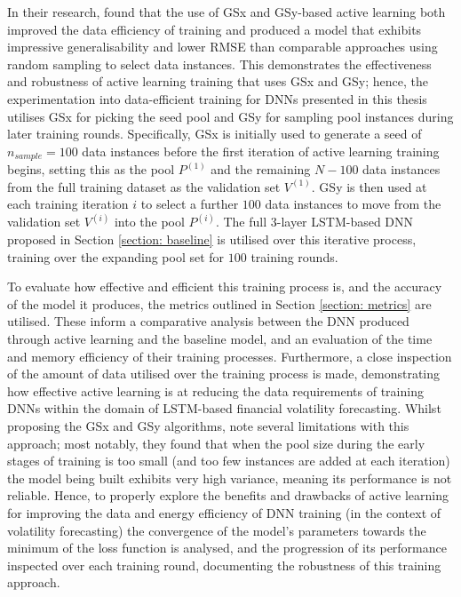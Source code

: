 \documentclass[a4paper, 11pt]{report}
\begin{document}
    In their research, \citet{wu-2019} found that the use of GSx and GSy-based active learning both improved the data efficiency of training and produced a model that exhibits impressive generalisability and lower RMSE than comparable approaches using random sampling to select data instances. This demonstrates the effectiveness and robustness of active learning training that uses GSx and GSy; hence, the experimentation into data-efficient training for DNNs presented in this thesis utilises GSx for picking the seed pool and GSy for sampling pool instances during later training rounds. Specifically, GSx is initially used to generate a seed of $n_{sample} = 100$ data instances before the first iteration of active learning training begins, setting this as the pool $P^{(1)}$ and the remaining $N - 100$ data instances from the full training dataset as the validation set $V^{(1)}$. GSy is then used at each training iteration $i$ to select a further $100$ data instances to move from the validation set $V^{(i)}$ into the pool $P^{(i)}$. The full $3$-layer LSTM-based DNN proposed in Section \ref{section: baseline} is utilised over this iterative process, training over the expanding pool set for $100$ training rounds.

    To evaluate how effective and efficient this training process is, and the accuracy of the model it produces, the metrics outlined in Section \ref{section: metrics} are utilised. These inform a comparative analysis between the DNN produced through active learning and the baseline model, and an evaluation of the time and memory efficiency of their training processes. Furthermore, a close inspection of the amount of data utilised over the training process is made, demonstrating how effective active learning is at reducing the data requirements of training DNNs within the domain of LSTM-based financial volatility forecasting. Whilst proposing the GSx and GSy algorithms, \citet{wu-2019} note several limitations with this approach; most notably, they found that when the pool size during the early stages of training is too small (and too few instances are added at each iteration) the model being built exhibits very high variance, meaning its performance is not reliable. Hence, to properly explore the benefits and drawbacks of active learning for improving the data and energy efficiency of DNN training (in the context of volatility forecasting) the convergence of the model's parameters towards the minimum of the loss function is analysed, and the progression of its performance inspected over each training round, documenting the robustness of this training approach.
\end{document}
